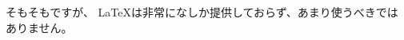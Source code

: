 \documentclass[a5paper,landscape,11pt]{ltjtarticle}
\begin{document}
そもそもですが、
 \LaTeX は非常になしか提供しておらず、あまり使うべきではありません。
\end{document}
